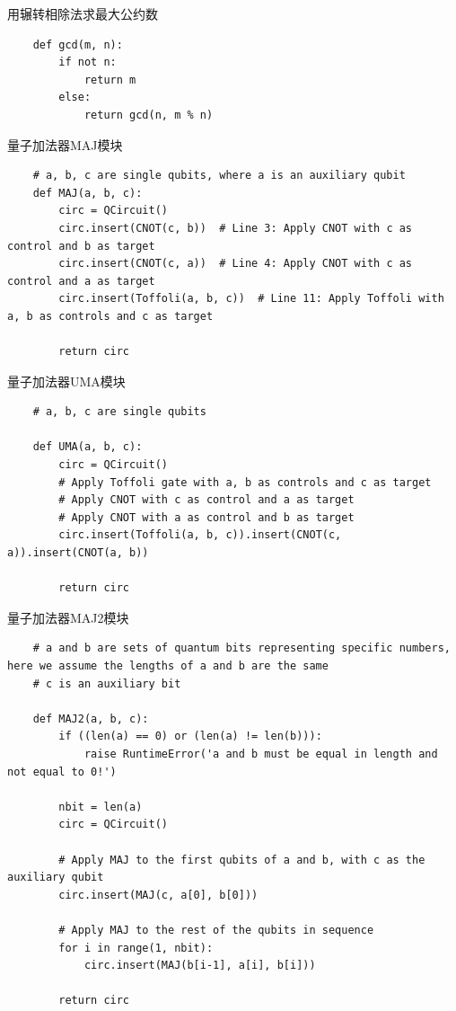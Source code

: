 \documentclass[12pt,hyperref,a4paper,UTF8]{ctexart}
\begin{document}
用辗转相除法求最大公约数
\begin{lstlisting}
    def gcd(m, n):
        if not n:
            return m
        else:
            return gcd(n, m % n)
\end{lstlisting}

量子加法器MAJ模块
\begin{lstlisting}
    # a, b, c are single qubits, where a is an auxiliary qubit
    def MAJ(a, b, c):
        circ = QCircuit()
        circ.insert(CNOT(c, b))  # Line 3: Apply CNOT with c as control and b as target
        circ.insert(CNOT(c, a))  # Line 4: Apply CNOT with c as control and a as target
        circ.insert(Toffoli(a, b, c))  # Line 11: Apply Toffoli with a, b as controls and c as target

        return circ
\end{lstlisting}

量子加法器UMA模块
\begin{lstlisting}
    # a, b, c are single qubits

    def UMA(a, b, c):
        circ = QCircuit()
        # Apply Toffoli gate with a, b as controls and c as target
        # Apply CNOT with c as control and a as target
        # Apply CNOT with a as control and b as target
        circ.insert(Toffoli(a, b, c)).insert(CNOT(c, a)).insert(CNOT(a, b))

        return circ
\end{lstlisting}

量子加法器MAJ2模块
\begin{lstlisting}
    # a and b are sets of quantum bits representing specific numbers, here we assume the lengths of a and b are the same
    # c is an auxiliary bit

    def MAJ2(a, b, c):
        if ((len(a) == 0) or (len(a) != len(b))):
            raise RuntimeError('a and b must be equal in length and not equal to 0!')

        nbit = len(a)
        circ = QCircuit()

        # Apply MAJ to the first qubits of a and b, with c as the auxiliary qubit
        circ.insert(MAJ(c, a[0], b[0]))

        # Apply MAJ to the rest of the qubits in sequence
        for i in range(1, nbit):
            circ.insert(MAJ(b[i-1], a[i], b[i]))

        return circ
\end{lstlisting}
\end{document}
